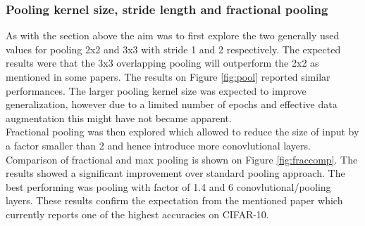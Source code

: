 \documentclass[12pt]{article}
\begin{document}
\subsubsection*{Pooling kernel size, stride length and fractional pooling}

As with the section above the aim was to first explore the two generally used values for pooling 2x2 and 3x3 with stride 1 and 2 respectively. The expected results were that the 3x3 overlapping pooling will outperform the 2x2 as mentioned in some papers\cite{inspiration}\cite{frac}. The results on Figure \ref{fig:pool} reported similar performances. The larger pooling kernel size was expected to improve generalization, however due to a limited number of epochs and effective data augmentation this might have not became apparent. 
\\


Fractional pooling\cite{frac} was then explored which allowed to reduce the size of input by a factor smaller than 2 and hence introduce more conovlutional layers. Comparison of fractional and max pooling is shown on Figure \ref{fig:fraccomp}. The results showed a significant improvement over standard pooling approach. The best performing was pooling with factor of 1.4 and 6 conovlutional/pooling layers. These results confirm the expectation from the mentioned paper which currently reports one of the highest accuracies on CIFAR-10.
\end{document}
